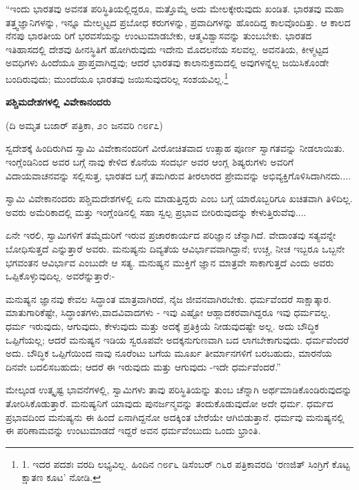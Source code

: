 “ಇಂದು ಭಾರತವು ಅವನತ ಪರಿಸ್ಥಿತಿಯಲ್ಲಿದ್ದರೂ, ಮತ್ತೊಮ್ಮೆ ಅದು ಮೇಲಕ್ಕೇರುವುದು ಖಂಡಿತ. ಭಾರತವು ಮಹಾ ತತ್ತ್ವಜ್ಞಾನಿಗಳನ್ನು, ಇನ್ನೂ ಮೇಲ್ಮಟ್ಟದ ಪ್ರಬೋಧ ಕರುಗಳನ್ನು, ಪ್ರವಾದಿಗಳನ್ನು ಹೊಂದಿದ್ದ ಕಾಲವೊಂದಿತ್ತು. ಆ ಕಾಲದ ನೆನಪು ಭಾರತೀಯ ರಿಗೆ ಭರವಸೆಯನ್ನು ಉಂಟುಮಾಡಬೇಕು, ಆತ್ಮವಿಶ್ವಾಸವನ್ನು ತುಂಬಬೇಕು. ಭಾರತದ ಇತಿಹಾಸದಲ್ಲಿ ದೇಶವು ಹೀನಸ್ಥಿತಿಗೆ ಹೋಗಿರುವುದು ಇದೇನು ಮೊದಲನೆಯ ಸಲವಲ್ಲ. ಅವನತಿಯ, ಕೀಳ್ಮಟ್ಟದ ಅವಧಿಗಳು ಹಿಂದೆಯೂ ಪ್ರಾಪ್ತವಾಗಿದ್ದವು; ಆದರೆ ಭಾರತವು ಕಾಲಾನುಕ್ರಮದಲ್ಲಿ ಅವುಗಳನ್ನೆಲ್ಲ ಜಯಿಸಿಕೊಂಡೇ ಬಂದಿರುವುದು; ಮುಂದೆಯೂ ಭಾರತವು ಜಯಿಸುವುದರಿಲ್ಲ ಸಂಶಯವಿಲ್ಲ.\footnote{1. ಇದರ ಪದಶಃ ವರದಿ ಲಭ್ಯವಿಲ್ಲ. ಹಿಂದಿನ ೧೮೯೬ ಡಿಸೆಂಬರ್ ೧೬ರ ಪತ್ರಿಕಾವರದಿ ‘ರಣಜಿತ್ ಸಿಂಗ್ರಿಗೆ ಕೊಟ್ಟ ಕ್ಷಾತಣ ಕೂಟ’ ನೋಡಿ.}

\begin{center}
\textbf{ಪಶ್ಚಿಮದೇಶಗಳಲ್ಲಿ ವಿವೇಕಾನಂದರು}
\end{center}

\begin{center}
(ದಿ ಅಮೃತ ಬಜಾರ್ ಪತ್ರಿಕಾ, ೨೦ ಜನವರಿ ೧೮೯೭)
\end{center}

ಸ್ವದೇಶಕ್ಕೆ ಹಿಂದಿರುಗಿದ ಸ್ವಾಮಿ ವಿವೇಕಾನಂದರಿಗೆ ವೀರೋಚಿತವಾದ ಉತ್ಸಾಹ ಪೂರ್ಣ ಸ್ವಾಗತವನ್ನು ನೀಡಲಾಯಿತು. ಇಂಗ್ಲೆಂಡಿನಿಂದ ಅವರ ಬಗ್ಗೆ ನಾವು ಕೇಳಿದ ಕೊನೆಯ ಸಂದರ್ಭ ಅವರ ಆಂಗ್ಲ ಶಿಷ್ಯರುಗಳು ಅವರಿಗೆ ವಿದಾಯವಾಚನವನ್ನು ಸಲ್ಲಿಸುತ್ತ, ಭಾರತದ ಬಗ್ಗೆ ತಮಗಿರುವ ತೀರಲಾರದ ಪ್ರೇಮವನ್ನು ಅಭಿವ್ಯಕ್ತಿಗೊಳಿಸಿದಾಗಿನದು....

ಸ್ವಾಮಿ ವಿವೇಕಾನಂದರು ಪಶ್ಚಿಮದೇಶಗಳಲ್ಲಿ ಏನು ಮಾಡುತ್ತಿದ್ದರು ಎಂಬ ಬಗ್ಗೆ ಯಾರೊಬ್ಬರಿಗೂ ಖಚಿತವಾಗಿ ತಿಳಿದಿಲ್ಲ. ಅವರು ಅಮೆರಿಕಾದಲ್ಲಿ ಮತ್ತು ಇಂಗ್ಲೆಂಡಿನಲ್ಲಿ ಸಹಾ ಸ್ವಲ್ಪ ಪ್ರಭಾವ ಬೀರಿರುವುದನ್ನು ಕೇಳುತ್ತಿರುವೆವು....

ಏನೇ ಇರಲಿ, ಸ್ವಾಮಿಗಳಿಗೆ ತಮ್ಮೆದುರಿಗೆ ಇರುವ ಪ್ರಚಾರಕಾರ್ಯದ ಪರಿಜ್ಞಾನ ಚೆನ್ನಾಗಿದೆ. ವೇದಾಂತವು ಸತ್ಯವನ್ನೇ ಬೋಧಿಸುತ್ತದೆ ಎನ್ನುತ್ತಾರೆ ಅವರು. ಮನುಷ್ಯನು ದಿವ್ಯತೆಯ ಆವಿರ್ಭಾವವಾಗಿದ್ದಾನೆ; ಉಚ್ಚ, ನೀಚ ಇಬ್ಬರೂ ಒಬ್ಬನೇ ಭಗವಂತನ ಆವಿರ್ಭಾವ ಎಂಬುದೇ ಆ ಸತ್ಯ. ಮನುಷ್ಯನ ಮುಕ್ತಿಗೆ ಜ್ಞಾನ ಮಾತ್ರವೇ ಸಾಕಾಗುತ್ತದೆ ಎಂದು ಅವರು ಒಪ್ಪಿಕೊಳ್ಳುವುದಿಲ್ಲ. ಅವರೆನ್ನುತ್ತಾರೆ:-

ಮನುಷ್ಯನ ಜ್ಞಾನವು ಕೇವಲ ಸಿದ್ಧಾಂತ ಮಾತ್ರವಾಗಿರದೆ, ನೈಜ ಜೀವನವಾಗಿರಬೇಕು. ಧರ್ಮವೆಂದರೆ ಸಾಕ್ಷಾತ್ಕಾರ. ಮಾತುಗಾರಿಕೆಷ್ಟೇ, ಸಿದ್ಧಾಂತಗಳು,ವಾದವಿವಾದಗಳು - ಇವು ಎಷ್ಟೋ ಆಹ್ಲಾದಕರವಾಗಿದ್ದರೂ ಇವು ಧರ್ಮವಲ್ಲ. ಧರ್ಮ ಇರುವುದು, ಆಗುವುದು, ಕೇಳುವುದು ಮತ್ತು ಅದಕ್ಕೆ ಪ್ರತಿಕ್ರಿಯೆ ನೀಡುವುದಷ್ಟೇ ಅಲ್ಲ. ಅದು ಬೌದ್ಧಿಕ ಒಪ್ಪಿಗೆಯಲ್ಲ; ಆದರೆ ಮನುಷ್ಯನ ಇಡಿಯ ಸ್ವರೂಪವೇ ಅದಕ್ಕನುಗುಣವಾಗಿ ಬದ ಲಾಗಬೇಕಾಗುವುದು. ಧರ್ಮವೆಂದರೆ ಅದು. ಬೌದ್ಧಿಕ ಒಪ್ಪಿಗೆಯಿಂದ ನಾವು ನೂರೆಂಟು ಬಗೆಯ ಮೂರ್ಖ ತೀರ್ಮಾನಗಳಿಗೆ ಬರಬಹುದು, ಮಾರನೆಯ ದಿನವೇ ಬದಲಿಸಬಹುದು; ಆದರೆ ಈ ಇರುವುದು ಮತ್ತು ಆಗುವುದು -ಇದೇ ಧರ್ಮವೆಂದರೆ.”

ಮೇಲ್ಕಂಡ ಉತ್ಕೃಷ್ಟ ಭಾವನೆಗಳಲ್ಲಿ, ಸ್ವಾಮಿಗಳು ತಾವು ಪರಿಸ್ಥಿತಿಯನ್ನು ತುಂಬ ಚೆನ್ನಾಗಿ ಅರ್ಥಮಾಡಿಕೊಂಡಿರುವುದನ್ನು ತೋರಿಸಿಕೊಡುತ್ತಾರೆ. ಮನುಷ್ಯನಿಗೆ ಯಾವುದು ಪುನರ್ಜನ್ಮವನ್ನು ತಂದುಕೊಡುವುದೋ ಅದೇ ಧರ್ಮ. ಧರ್ಮದ ಪ್ರಭಾವದಿಂದ ಮನುಷ್ಯನು ಈ ಹಿಂದೆ ಏನಾಗಿದ್ದನೋ ಅದಕ್ಕಿಂತ ಬೇರೆಯೇ ಆಗಿಬಿಡುತ್ತಾನೆ. ಧರ್ಮವು ಮನುಷ್ಯನಲ್ಲಿ ಈ ಪರಿಣಾಮವನ್ನು ಉಂಟುಮಾಡದೆ ಇದ್ದರೆ ಅವನ ಧರ್ಮವೆಂಬುದು ಒಂದು ಭ್ರಾಂತಿ.


